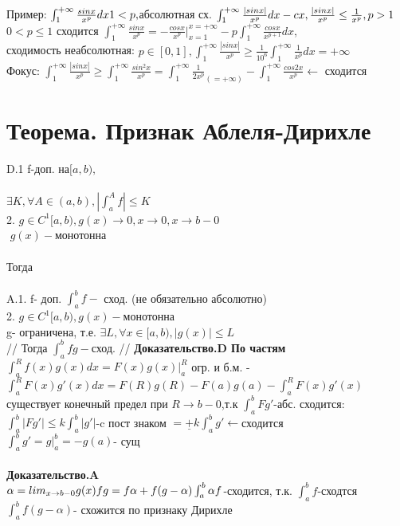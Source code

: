 \documentclass[12pt, a4paper]{article}
\begin{document}
Пример: $ \int_1^{+\infty} \frac{sinx}{x^p} dx\\
 1<p, $абсолютная сх. $ \int_1^{+\infty} \frac{|sinx|}{x^p}dx - cx, \frac{|sinx|}{x^p} \leq \frac{1}{x^p}, p>1\\ $
 \\
 $ 0<p\leq 1 $ сходится $ \int_1^{+\infty} \frac{sinx}{x^p}= -\frac{cosx}{x^p}|_{x=1}^{x=+\infty} -p \int_1^{+\infty} \frac{cosx}{x^{p+1}}dx $, \\
 сходимость неабсолютная: $ p \in [0,1], \int_1^{+\infty}\frac{|sinx|}{x^p}\geq \frac{1}{10^6}\int_1^{+\infty} \frac{1}{x^p}dx =+\infty $\\
 Фокус: $ \int_1^{+\infty} \frac{|sinx|}{x^p}\geq \int_1^{+\infty}\frac{sin^2x}{x^p}=\int_1^{+\infty}\frac{1}{2x^p}_{(=+\infty)}-\int_1^{+\infty}\frac{cos2x}{x^p} \leftarrow$ сходится\\
 \section{Теорема. Признак Аблеля-Дирихле}
 D.1 f-доп. на$ [a,b),$ \\
  \\
  $ \exists K, \forall A \in (a,b), |\int_a^A f| \leq K $\\
  2. $ g \in C^1[a,b), g(x) \rightarrow 0, x\rightarrow 0, x\rightarrow b - 0$\\$  $
$ g(x)- $монотонна\\
\\
Тогда \\
\\
A.1. f- доп.  $ \int_a^b f - $ сход. (не обязательно абсолютно)\\
 2. $ g \in C^1 [a,b), g(x)- $монотонна\\
 g- ограничена, т.е. $ \exists L, \forall x \in  [a,b), |g(x)|\leq L $\\
//
 Тогда $\int_a^b fg- $сход.
//     
\textbf{Доказательство.D По частям}\\
$ \int_a^R f(x)g(x)dx =F(x)g(x)|_a^R$ огр. и б.м. -$ \int_a^R F(x)g'(x)dx =F(R)g(R)-F(a)g(a) -\int_a^R F(x)g'(x) $ существует конечный предел при $ R \rightarrow b - 0 $,т.к $ \int_a^b Fg'$-абс. сходится:\\  $ \int_a^b |Fg'| \leq k \int_a^b|g'| $-c пост знаком $ = \underline{+} k \int_a^b g' \leftarrow$сходится \\ 
$ \int_a^b g' = g|_a^b= -g(a) $- сущ \\
\\
\textbf{Доказательство.A}\\
$ \alpha = lim_{x \rightarrow b - 0} g(x)\\
fg=f \alpha + f(g-\alpha)\\
\int_a^b \alpha f  $-сходится, т.к. $\int_a^b f  $-сходтся\\
$ \int_a^b  f(g - \alpha) $-  схожится по признаку Дирихле\\
\end{document}
